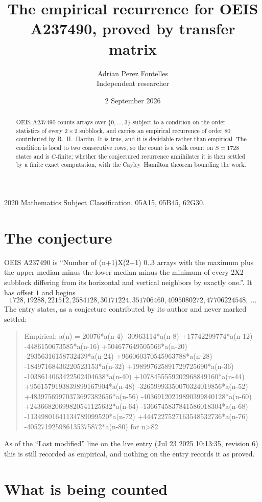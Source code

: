 \documentclass[11pt,a4paper]{article}
\title{The empirical recurrence for OEIS A237490, proved by transfer matrix}
\author{Adrian Perez Fontelles\\ \small Independent researcher}
\date{2 September 2026}
\theoremstyle{plain}
\theoremstyle{definition}
\begin{document}
\maketitle

\begin{abstract}
OEIS A237490 counts arrays over $\{0,\dots,3\}$ subject to a condition on the order
statistics of every $2\times2$ subblock, and carries an empirical recurrence of order
$80$ contributed by R.~H.~Hardin. It is true, and it is decidable rather than empirical.
The condition is local to two consecutive rows, so the count is a walk count on $S=1728$
states and is $C$-finite; whether the conjectured recurrence annihilates it is then settled by
a finite exact computation, with the Cayley--Hamilton theorem bounding the work.
\end{abstract}

\noindent\small 2020 Mathematics Subject Classification. 05A15, 05B45, 62G30.\normalsize

\section{The conjecture}

OEIS A237490 is ``Number of (n+1)X(2+1) 0..3 arrays with the maximum plus the upper median minus the lower median minus the minimum of every 2X2 subblock differing from its horizontal and vertical neighbors by exactly one.''. It has offset $1$ and begins
\[
1728, 19288, 221512, 2584128, 30171224, 351706460, 4095080272, 47706224548,\ \dots
\]
The entry states, as a conjecture contributed by its author and never marked settled:
\begin{quote}
Empirical: a(n) = 20076*a(n-4) -30963114*a(n-8) +17742299774*a(n-12) -4486150673585*a(n-16) +504677649505566*a(n-20) -29356316158732439*a(n-24) +966060370545963788*a(n-28) -18497168436220523153*a(n-32) +198997625891729725690*a(n-36) -1038614063422502404638*a(n-40) +1078455559202968849160*a(n-44) +9561579193839899167904*a(n-48) -32659993350070324019856*a(n-52) +48397569970373697382656*a(n-56) -40369120219890399840128*a(n-60) +24366820699820541125632*a(n-64) -1366745837841586018304*a(n-68) -11349801641134789099520*a(n-72) +4447227527163548532736*a(n-76) -405271925986135375872*a(n-80) for n>82
\end{quote}
As of the ``Last modified'' line on the live entry (Jul 23 2025 10:13:35, revision 6) this is still
recorded as empirical, and nothing on the entry records it as proved.

\section{What is being counted}
\end{document}
